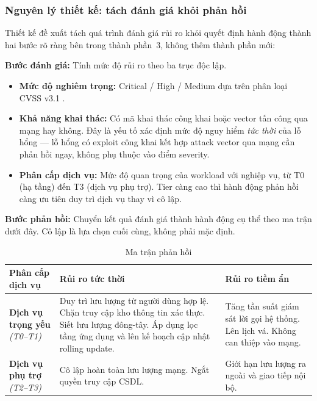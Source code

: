 \subsubsection{Nguyên lý thiết kế: tách đánh giá khỏi phản hồi}

Thiết kế đề xuất tách quá trình đánh giá rủi ro khỏi quyết định hành động thành hai bước rõ ràng bên trong thành phần~3, không thêm thành phần mới:

\textbf{Bước đánh giá:} Tính mức độ rủi ro theo ba trục độc lập.

\begin{itemize}[itemsep=3pt, parsep=0pt]
    \item \textbf{Mức độ nghiêm trọng:} Critical / High / Medium dựa trên phân loại CVSS v3.1 \parencite{FIRST2019}.
    \item \textbf{Khả năng khai thác:} Có mã khai thác công khai hoặc vector tấn công qua mạng hay không. Đây là yếu tố xác định mức độ nguy hiểm \textit{tức thời} của lỗ hổng --- lỗ hổng có exploit công khai kết hợp attack vector qua mạng cần phản hồi ngay, không phụ thuộc vào điểm severity.
    \item \textbf{Phân cấp dịch vụ:} Mức độ quan trọng của workload với nghiệp vụ, từ T0 (hạ tầng) đến T3 (dịch vụ phụ trợ). Tier càng cao thì hành động phản hồi càng ưu tiên duy trì dịch vụ thay vì cô lập.
\end{itemize}

\textbf{Bước phản hồi:} Chuyển kết quả đánh giá thành hành động cụ thể theo ma trận dưới đây. Cô lập là lựa chọn cuối cùng, không phải mặc định.

\begin{table}[H]
\centering
\caption{Ma trận phản hồi}
\label{tab:risk_matrix}
\renewcommand{\arraystretch}{1.4}
\TableRiskColors
\begin{tabularx}{\textwidth}{|L{3.8cm}|Y|Y|}
\hline
{}
\textbf{Phân cấp dịch vụ} &
\textbf{Rủi ro tức thời} &
\textbf{Rủi ro tiềm ẩn} 
\\
\hline
\textbf{Dịch vụ trọng yếu} \newline
\textit{(T0--T1)} &
Duy trì lưu lượng từ người dùng hợp lệ. Chặn truy cập kho thông tin xác thực. Siết lưu lượng đông-tây. Áp dụng lọc tầng ứng dụng và lên kế hoạch cập nhật rolling update. & Tăng tần suất giám sát lời gọi hệ thống. Lên lịch vá. Không can thiệp vào mạng. \\
\hline
\textbf{Dịch vụ phụ trợ} \newline
\textit{(T2--T3)} &
Cô lập hoàn toàn lưu lượng mạng. Ngắt quyền truy cập CSDL. & Giới hạn lưu lượng ra ngoài và giao tiếp nội bộ. \\
\hline
\end{tabularx}
\end{table}

